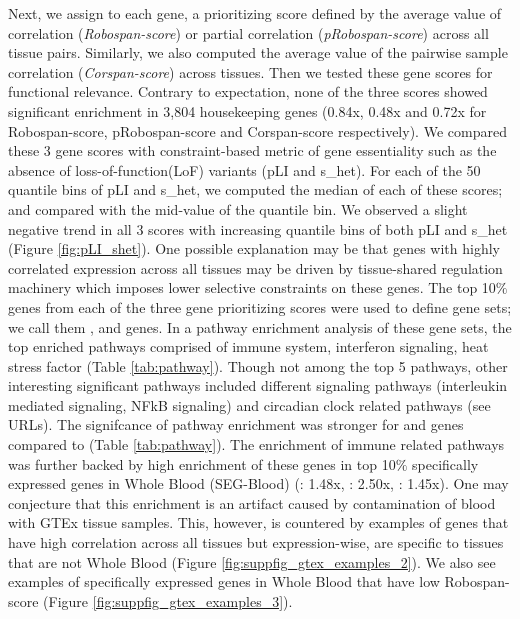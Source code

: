 Next, we assign to each gene, a prioritizing score defined by the average value of \Robocov{} correlation (\textit{Robospan-score}) or partial correlation (\textit{pRobospan-score}) across all tissue pairs. Similarly, we also computed the average value of the pairwise sample correlation (\textit{Corspan-score}) across tissues. Then we tested these gene scores for functional relevance. Contrary to expectation, none of the three scores showed significant enrichment in 3,804 housekeeping genes\cite{eisenberg2013} (0.84x, 0.48x and 0.72x for Robospan-score,  pRobospan-score and Corspan-score  respectively). We compared these 3 gene scores with constraint-based metric of gene essentiality such as the absence of loss-of-function(LoF) variants (pLI\cite{Lek2016} and s\_het\cite{cassa2017}). For each of the 50 quantile bins of pLI and s\_het, we computed the median of each of these scores; and compared with the mid-value of the quantile bin. We observed a slight negative trend in all 3 scores with increasing quantile bins of both pLI and  s\_het  (Figure \ref{fig:pLI_shet}). One possible explanation may be that genes with highly correlated expression across all tissues may be driven by tissue-shared regulation machinery which imposes lower selective constraints on these genes. 
The top 10$\%$ genes from each of the three gene prioritizing scores were used to define gene sets; we call them \Robospan{}, \pRobospan{} and \Corspan{} genes. In a pathway  enrichment analysis\cite{Kamburov2012} of these gene sets, the top enriched pathways comprised of immune system, interferon signaling, heat stress factor (Table \ref{tab:pathway}). Though not among the top 5 pathways, other interesting significant pathways included different signaling pathways (interleukin mediated signaling, NFkB signaling) and circadian clock related pathways (see URLs). The signifcance of pathway enrichment was stronger for \Robospan{} and \pRobospan{} genes compared to \Corspan{}(Table \ref{tab:pathway}). The enrichment of immune related pathways was further backed by high enrichment of these genes in top 10$\%$ specifically expressed genes in Whole Blood (SEG-Blood\cite{Finucane2018}) (\Robospan{}: 1.48x, \pRobospan{}: 2.50x, \Corspan{}: 1.45x). One may conjecture that this enrichment is an artifact caused by contamination of blood with GTEx tissue samples. This, however, is countered by examples of genes that have high correlation across all tissues but expression-wise, are specific to tissues that are not Whole Blood (Figure \ref{fig:suppfig_gtex_examples_2}). We also see examples of specifically expressed genes in Whole Blood that have low Robospan-score (Figure \ref{fig:suppfig_gtex_examples_3}).

